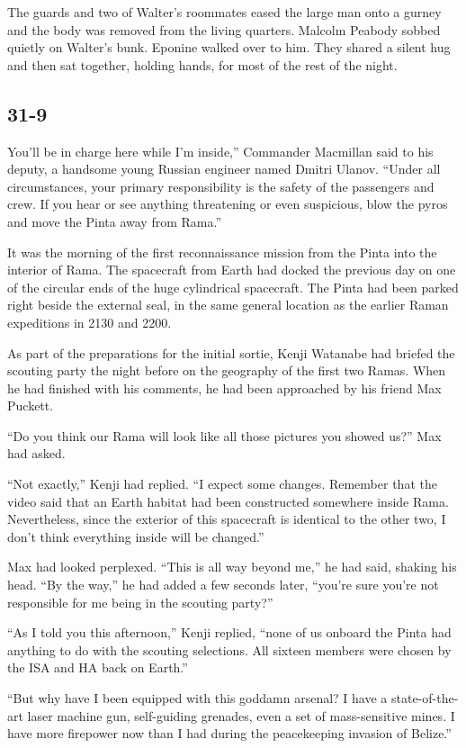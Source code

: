 \documentclass[]{article}
\begin{document}
{The guards and two of Walter’s roommates eased the large man onto a gurney and the body was removed from the living quarters.  Malcolm Peabody sobbed quietly on Walter’s bunk.  Eponine walked over to him.  They shared a silent hug and then sat together, holding hands, for most of the rest of the night.


\subsection*{31-9}

You’ll be in charge here while I’m inside,” Commander Macmillan said to his deputy, a handsome young Russian engineer named Dmitri Ulanov.  “Under all circumstances, your primary responsibility is the safety of the passengers and crew.  If you hear or see anything threatening or even suspicious, blow the pyros and move the Pinta away from Rama.”

It was the morning of the first reconnaissance mission from the Pinta into the interior of Rama.  The spacecraft from Earth had docked the previous day on one of the circular ends of the huge cylindrical spacecraft.  The Pinta had been parked right beside the external seal, in the same general location as the earlier Raman expeditions in 2130 and 2200.

As part of the preparations for the initial sortie, Kenji Watanabe had briefed the scouting party the night before on the geography of the first two Ramas.  When he had finished with his comments, he had been approached by his friend Max Puckett.

“Do you think our Rama will look like all those pictures you showed us?” Max had asked.

“Not exactly,” Kenji had replied.  “I expect some changes.  Remember that the video said that an Earth habitat had been constructed somewhere inside Rama.  Nevertheless, since the exterior of this spacecraft is identical to the other two, I don’t think everything inside will be changed.”

Max had looked perplexed.  “This is all way beyond me,” he had said, shaking his head.  “By the way,” he had added a few seconds later, “you’re sure you’re not responsible for me being in the scouting party?”

“As I told you this afternoon,” Kenji replied, “none of us onboard the Pinta had anything to do with the scouting selections.  All sixteen members were chosen by the ISA and HA back on Earth.”

“But why have I been equipped with this goddamn arsenal? I have a state-of-the-art laser machine gun, self-guiding grenades, even a set of mass-sensitive mines.  I have more firepower now than I had during the peacekeeping invasion of Belize.”

}
\end{document}
